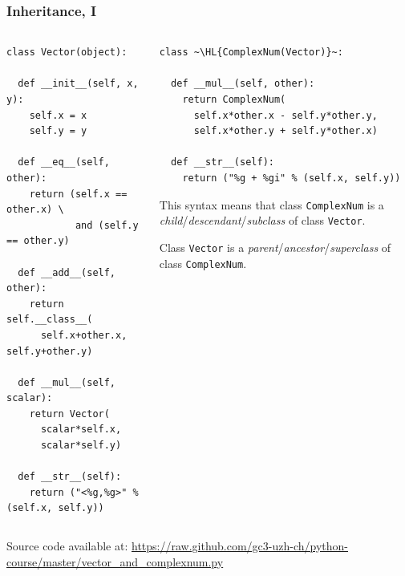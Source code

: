 \documentclass[english,serif,mathserif,xcolor=pdftex,dvipsnames,table]{beamer}
\begin{document}
\begin{frame}[fragile]
  \frametitle{Inheritance, I}

  \begin{columns}[t]
    \begin{column}{0.5\textwidth}
\begin{lstlisting}[basicstyle=\tiny\ttfamily,showstringspaces=false]
class Vector(object):

  def __init__(self, x, y):
    self.x = x
    self.y = y

  def __eq__(self, other):
    return (self.x == other.x) \
            and (self.y == other.y)

  def __add__(self, other):
    return self.__class__(
      self.x+other.x, self.y+other.y)

  def __mul__(self, scalar):
    return Vector(
      scalar*self.x,
      scalar*self.y)

  def __str__(self):
    return ("<%g,%g>" % (self.x, self.y))
\end{lstlisting}
    \end{column}
    \begin{column}{0.5\textwidth}
\begin{lstlisting}[basicstyle=\tiny\ttfamily,showstringspaces=false]
class ~\HL{ComplexNum(Vector)}~:

  def __mul__(self, other):
    return ComplexNum(
      self.x*other.x - self.y*other.y,
      self.x*other.y + self.y*other.x)

  def __str__(self):
    return ("%g + %gi" % (self.x, self.y))
\end{lstlisting}

      \+
      This syntax means that class \texttt{ComplexNum} is a
      \emph{child}/\emph{descendant}/\emph{subclass} of class \texttt{Vector}.

      \+
      Class \texttt{Vector} is a
      \emph{parent}/\emph{ancestor}/\emph{superclass} of class
      \texttt{ComplexNum}.
    \end{column}
  \end{columns}

  \+
  {\scriptsize Source code available at:
    \url{https://raw.github.com/gc3-uzh-ch/python-course/master/vector_and_complexnum.py}}
\end{frame}
\end{document}
